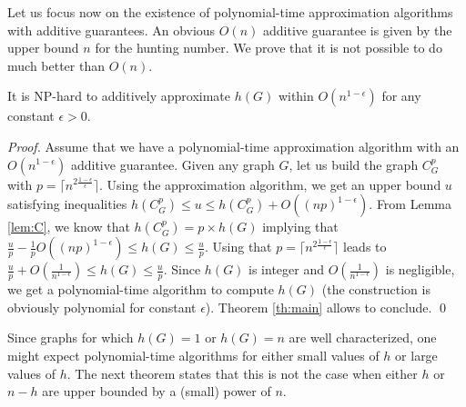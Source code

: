 \documentclass[runningheads]{llncs}
\newcommand{\wal}[1]{\textcolor{red}{#1}}
\newcommand{\ale}[1]{\textcolor{blue}{#1}}
\begin{document}

Let us focus now on the existence of polynomial-time approximation algorithms with additive guarantees. 
An obvious $O(n)$ additive guarantee is given by the upper bound $n$ for the {hunting number}.  We prove that  it is not possible to do much better than $O(n)$.  
\begin{theorem}
It is NP-hard to additively approximate $h(G)$ within $O(n^{1 - \epsilon})$ for any constant $\epsilon >0$. \label{th:add}
\end{theorem}
\begin{proof}
Assume that we have a polynomial-time approximation algorithm with an $O(n^{1 - \epsilon})$ additive guarantee. Given any graph $G$, let us build the graph $C_G^p$ with $p= \lceil n^{2\frac{1-\epsilon}{\epsilon}}\rceil $. Using the approximation algorithm, we get an upper bound $u$ satisfying inequalities $h(C^p_G) \leq u \leq h(C^p_G) + O({(np)}^{1-\epsilon})$. From  Lemma \ref{lem:C}, we know that $h(C^p_G) = p \times h(G)$ implying that $ \frac{u}{p} -\frac{1}{p} O({(np)}^{1-\epsilon}) \leq h(G) \leq \frac{u}{p}$.  Using that $p= \lceil n^{2\frac{1-\epsilon}{\epsilon}} \rceil$ leads to $\frac{u}{p} + O(\frac{1}{n^{1-\epsilon}}) \leq   h(G)  \leq  \frac{u}{p}$. Since $h(G)$ is integer and $O(\frac{1}{n^{1-\epsilon}})$ is negligible,
we get a polynomial-time algorithm to compute $h(G)$ (the construction is obviously polynomial for constant $\epsilon$). Theorem \ref{th:main} allows to conclude.
\qed\end{proof}

Since graphs for which $h(G) = 1$ or $h(G)= n$ are well characterized, one might expect polynomial-time algorithms for either small values of $h$ or large values of $h$. The next theorem states that this is not the case {when {either} $h$ {or} $n-h$ are upper bounded by a (small) power of $n$}.  
\end{document}
